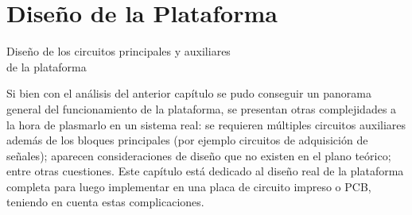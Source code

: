 \section{Diseño de la Plataforma} \label{diseño}
\thispagestyle{plain}

\vspace{0.5cm}

\Large\scshape
\begin{center}
    {\Medium Diseño de los circuitos principales y auxiliares\\ de la plataforma}
\end{center}
\normalfont

\divider

Si bien con el análisis del anterior capítulo se pudo conseguir un panorama general del funcionamiento de la plataforma, se presentan otras complejidades a la hora de plasmarlo en un sistema real: se requieren múltiples circuitos auxiliares además de los bloques principales (por ejemplo circuitos de adquisición de señales); aparecen consideraciones de diseño que no existen en el plano teórico; entre otras cuestiones. Este capítulo está dedicado al diseño real de la plataforma completa para luego implementar en una placa de circuito impreso o PCB, teniendo en cuenta estas complicaciones.\\

